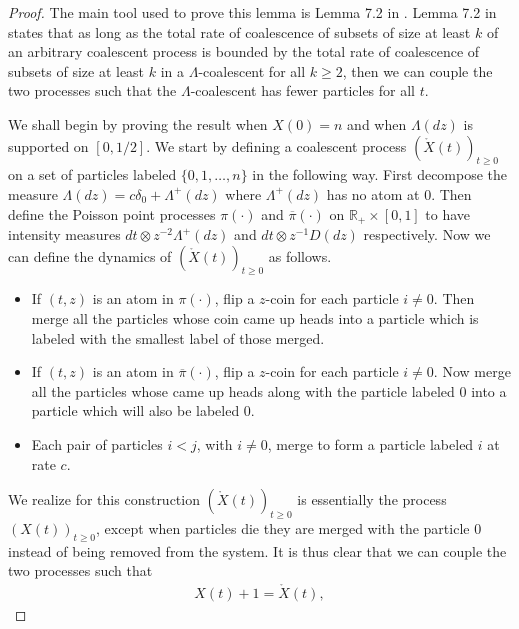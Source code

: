 \documentclass[11pt]{article}
\theoremstyle{definition}
\newcommand{\R}{\mathbb{R}}
\begin{document}
\begin{proof}
    The main tool used to prove this lemma is Lemma 7.2 in \cite{Angel2012}. Lemma 7.2 in \cite{Angel2012} states that as long as the total rate of coalescence of subsets of size at least $k$ of an arbitrary coalescent process is bounded by the total rate of coalescence of subsets of size at least $k$ in a $\Lambda$-coalescent for all $k \geq 2$, then we can couple the two processes such that the $\Lambda$-coalescent has fewer particles for all $t$.
    \medskip

    \noindent We shall begin by proving the result when $X(0) = n$ and when $\Lambda(dz)$ is supported on $[0,1/2]$. We start by defining a coalescent process $(\mathring{X}(t))_{t \geq 0}$ on a set of particles labeled $\{0, 1, \ldots, n\}$ in the following way. First decompose the measure $\Lambda(dz) = c\delta_0 + \Lambda^+(dz)$ where $\Lambda^+(dz)$ has no atom at $0$. Then define the Poisson point processes $\pi(\cdot)$ and $\overline{\pi}(\cdot)$ on $\R_+ \times [0,1]$ to have intensity measures $dt \otimes z^{-2}\Lambda^+(dz)$ and $dt \otimes z^{-1}D(dz)$ respectively. Now we can define the dynamics of $(\mathring{X}(t))_{t \geq 0}$ as follows.

    \begin{itemize}
        \item If $(t,z)$ is an atom in $\pi(\cdot)$, flip a $z$-coin for each particle $i \neq 0$. Then merge all the particles whose coin came up heads into a particle which is labeled with the smallest label of those merged.

        \item If $(t,z)$ is an atom in $\overline{\pi}(\cdot)$, flip a $z$-coin for each particle $i \neq 0$. Now merge all the particles whose came up heads along with the particle labeled $0$ into a particle which will also be labeled $0$.

        \item Each pair of particles $i<j$, with $i \neq 0$, merge to form a particle labeled $i$ at rate $c$.
    \end{itemize}

    \noindent We realize for this construction $(\mathring{X}(t))_{t \geq 0}$ is essentially the process $(X(t))_{t \geq 0}$, except when particles die they are merged with the particle $0$ instead of being removed from the system. It is thus clear that we can couple the two processes such that
    \begin{align*}
        X(t) + 1 = \mathring{X}(t),
    \end{align*}


\end{proof}
\end{document}
